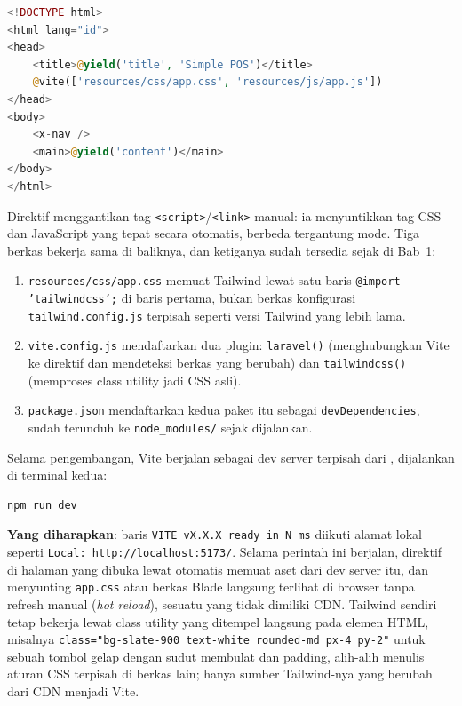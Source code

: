 \begin{lstlisting}[language=php, title=\lstfile{resources/views/layouts/app.blade.php}]
<!DOCTYPE html>
<html lang="id">
<head>
    <title>@yield('title', 'Simple POS')</title>
    @vite(['resources/css/app.css', 'resources/js/app.js'])
</head>
<body>
    <x-nav />
    <main>@yield('content')</main>
</body>
</html>
\end{lstlisting}

Direktif  menggantikan tag \texttt{<script>}/\texttt{<link>}
manual: ia menyuntikkan tag CSS dan JavaScript yang tepat secara otomatis,
berbeda tergantung mode. Tiga berkas bekerja sama di baliknya, dan ketiganya
sudah tersedia sejak  di Bab~1:

\begin{enumerate}
  \item \texttt{resources/css/app.css} memuat Tailwind lewat satu baris
    \texttt{@import 'tailwindcss';} di baris pertama, bukan berkas
    konfigurasi \texttt{tailwind.config.js} terpisah seperti versi Tailwind
    yang lebih lama.
  \item \texttt{vite.config.js} mendaftarkan dua plugin:
    \texttt{laravel()} (menghubungkan Vite ke direktif  dan
    mendeteksi berkas yang berubah) dan \texttt{tailwindcss()} (memproses
    class utility jadi CSS asli).
  \item \texttt{package.json} mendaftarkan kedua paket itu sebagai
    \texttt{devDependencies}, sudah terunduh ke \texttt{node\_modules/}
    sejak  dijalankan.
\end{enumerate}

Selama pengembangan, Vite berjalan sebagai dev server terpisah dari
, dijalankan di terminal kedua:

\begin{lstlisting}[language=bash]
npm run dev
\end{lstlisting}

\textbf{Yang diharapkan}: baris \texttt{VITE vX.X.X ready in N ms} diikuti
alamat lokal seperti \texttt{Local: http://localhost:5173/}. Selama
perintah ini berjalan, direktif  di halaman yang dibuka lewat
 otomatis memuat aset dari dev server itu, dan
menyunting \texttt{app.css} atau berkas Blade langsung terlihat di browser
tanpa refresh manual (\textit{hot reload}), sesuatu yang tidak dimiliki
CDN. Tailwind sendiri tetap bekerja lewat class utility yang ditempel
langsung pada elemen HTML, misalnya \texttt{class="bg-slate-900 text-white
rounded-md px-4 py-2"} untuk sebuah tombol gelap dengan sudut membulat dan
padding, alih-alih menulis aturan CSS terpisah di berkas lain; hanya
sumber Tailwind-nya yang berubah dari CDN menjadi Vite.

